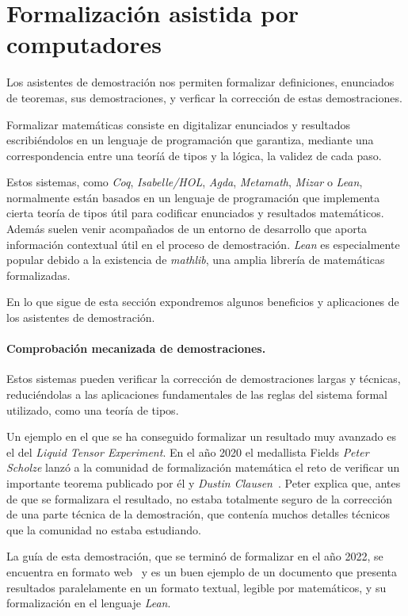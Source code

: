 \section{Formalización asistida por computadores}

Los asistentes de demostración nos permiten formalizar definiciones, enunciados
de teoremas, sus demostraciones, y verficar la corrección de estas demostraciones.

Formalizar matemáticas consiste en digitalizar enunciados y resultados
escribiéndolos en un lenguaje de programación que garantiza, mediante una
correspondencia entre una teoríá de tipos y la lógica, la validez de cada paso.

Estos sistemas, como \textit{Coq},  \textit{Isabelle/HOL},  \textit{Agda},
\textit{Metamath}, \textit{Mizar} o \textit{Lean}, normalmente están basados en
un lenguaje de programación que implementa cierta teoría de tipos útil para
codificar enunciados y resultados matemáticos. Además suelen venir acompañados
de un entorno de desarrollo que aporta información contextual útil en el proceso
de demostración. \textit{Lean} es especialmente popular debido a la existencia
de \textit{mathlib}, una amplia librería de matemáticas formalizadas.

En lo que sigue de esta sección expondremos algunos beneficios y aplicaciones
de los asistentes de demostración.

\paragraph{Comprobación mecanizada de demostraciones.}

Estos sistemas pueden verificar la corrección de demostraciones largas y
técnicas, reduciéndolas a las aplicaciones fundamentales de las reglas del
sistema formal utilizado, como una teoría de tipos.

Un ejemplo en el que se ha conseguido formalizar un resultado muy avanzado es el
del \textit{Liquid Tensor Experiment}. En el año 2020 el medallista Fields
\textit{Peter Scholze} lanzó a la comunidad de formalización matemática el reto
de verificar un importante teorema publicado por él y \textit{Dustin
	Clausen}~\cite{scholzeLiquidTensorExperiment2022}. Peter explica que, antes de
que se formalizara el resultado, no estaba totalmente seguro de la corrección de
una parte técnica de la demostración, que contenía muchos detalles técnicos que
la comunidad no estaba estudiando.

La guía de esta demostración, que se terminó de formalizar en el año 2022, se
encuentra en formato web~\cite{scholzeBlueprintLiquidTensor} y es un buen
ejemplo de un documento que presenta resultados paralelamente en un formato
textual, legible por matemáticos, y su formalización en el lenguaje
\textit{Lean}.

